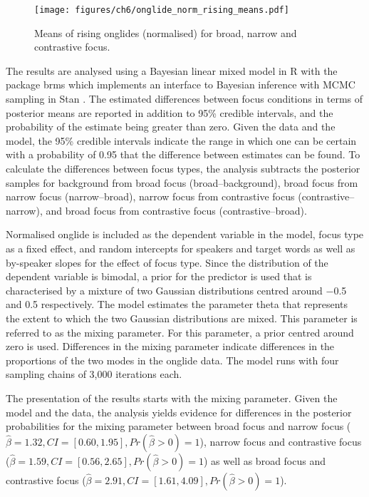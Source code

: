 \begin{figure}
\texttt{[image: figures/ch6/onglide\_norm\_rising\_means.pdf]}
\caption{Means of rising onglides (normalised) for broad, narrow and contrastive focus.}
\label{fig:onglide_means}
\end{figure}

The results are analysed using a Bayesian linear mixed model in R \citep{RCoreTeam2018} with the package brms \citep{Buerkner2018} which implements an interface to Bayesian inference with MCMC sampling in Stan \citep{Carpenteretal2017}. The estimated differences between focus conditions in terms of posterior means are reported in addition to 95\% credible intervals, and the probability of the estimate being greater than zero. Given the data and the model, the 95\% credible intervals indicate the range in which one can be certain with a probability of 0.95 that the difference between estimates can be found. To calculate the differences between focus types,  the analysis subtracts the posterior samples for background from broad focus (broad–background), broad focus from narrow focus (narrow–broad), narrow focus from contrastive focus (contrastive–narrow), and broad focus from contrastive focus (contrastive–broad).

Normalised onglide is included as the dependent variable in the model, focus type as a fixed effect, and random intercepts for speakers and target words as well as by-speaker slopes for the effect of focus type. Since the distribution of the dependent variable is bimodal, a prior for the predictor is used that is characterised by a mixture of two Gaussian distributions centred around −0.5 and 0.5 respectively. The model estimates the parameter theta that represents the extent to which the two Gaussian distributions are mixed. This parameter is referred to as the mixing parameter. For this parameter, a prior centred around zero is used. Differences in the mixing parameter indicate differences in the proportions of the two modes in the onglide data. The model runs with four sampling chains of 3,000 iterations each.

The presentation of the results starts with the mixing parameter. Given the model and the data, the analysis yields evidence for differences in the posterior probabilities for the mixing parameter between broad focus and narrow focus ($\hat\beta=1.32, CI=[0.60, 1.95], \allowbreak Pr(\hat\beta>0)=1$), narrow focus and contrastive focus ($\hat\beta=1.59, CI=[0.56, 2.65], \allowbreak Pr(\hat\beta>0)=1$) as well as broad focus and contrastive focus ($\hat\beta=2.91, CI=[1.61, 4.09], \allowbreak Pr(\hat\beta>0)=1$).

